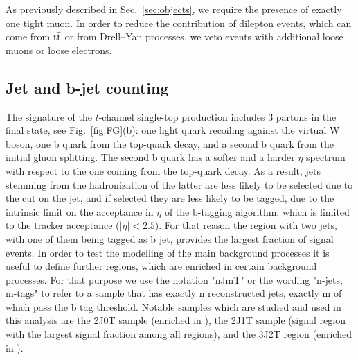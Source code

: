 As previously described in Sec.~\ref{sec:objects}, we require the presence of exactly one tight muon.
In order to reduce the contribution of dilepton events, which can come from $\mathrm{t}\bar{\mathrm{t}}$ or from Drell--Yan processes, 
we veto events with additional loose muons or loose electrons.


\subsection{Jet and b-jet counting}
\label{sec:bcounting}

The signature of the $t$-channel single-top production includes 3 partons in the final state, see Fig.~\ref{fig:FG}(b): 
one light quark recoiling against the virtual W boson, one b quark from the 
top-quark decay, and a second b quark from the initial gluon splitting. 
The second b quark has a softer \pt and a harder $\eta$ spectrum with respect to the one coming from the top-quark decay.
As a result, jets stemming from the hadronization of the latter are less likely to be selected due to the \pt cut on the jet, and if selected they are less likely to be tagged, due to the intrinsic limit on the acceptance in $\eta$ of the b-tagging algorithm, which is limited to the tracker acceptance ($|\eta|<2.5$). For that reason the region with two jets, with one of them being tagged as b jet, provides the largest fraction of signal events. In order to test the modelling of the main background processes it is useful to define further regions, which are enriched in certain background processes. For that purpose we use the notation "nJmT" or the wording "n-jets, m-tags" to refer to a sample that has exactly n reconstructed jets, exactly m of which pass the b tag threshold. Notable samples which are studied and used in this analysis are the 2J0T sample (enriched in \wjets), the 2J1T sample (signal region with the largest signal fraction among all regions), and the 3J2T region (enriched in \ttbar).

